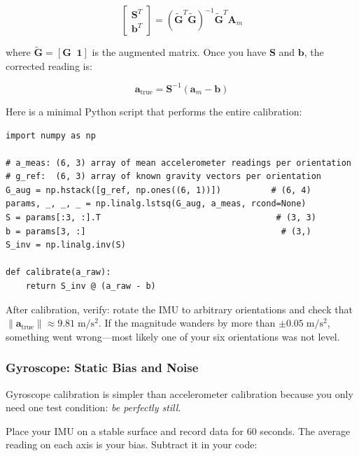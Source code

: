 \begin{equation}
\begin{bmatrix} \mathbf{S}^T \\ \mathbf{b}^T \end{bmatrix}
= \left( \tilde{\mathbf{G}}^T \tilde{\mathbf{G}} \right)^{-1} \tilde{\mathbf{G}}^T \mathbf{A}_m
\end{equation}

where $\tilde{\mathbf{G}} = [\mathbf{G} \;\; \mathbf{1}]$ is the augmented matrix. Once you have $\mathbf{S}$ and $\mathbf{b}$, the corrected reading is:

\begin{equation}
\mathbf{a}_{\text{true}} = \mathbf{S}^{-1} (\mathbf{a}_m - \mathbf{b})
\end{equation}

Here is a minimal Python script that performs the entire calibration:

\begin{verbatim}
import numpy as np

# a_meas: (6, 3) array of mean accelerometer readings per orientation
# g_ref:  (6, 3) array of known gravity vectors per orientation
G_aug = np.hstack([g_ref, np.ones((6, 1))])          # (6, 4)
params, _, _, _ = np.linalg.lstsq(G_aug, a_meas, rcond=None)
S = params[:3, :].T                                   # (3, 3)
b = params[3, :]                                       # (3,)
S_inv = np.linalg.inv(S)

def calibrate(a_raw):
    return S_inv @ (a_raw - b)
\end{verbatim}

After calibration, verify: rotate the IMU to arbitrary orientations and check that $\|\mathbf{a}_{\text{true}}\| \approx 9.81\;\mathrm{m/s^2}$. If the magnitude wanders by more than $\pm 0.05\;\mathrm{m/s^2}$, something went wrong---most likely one of your six orientations was not level.

\subsubsection{Gyroscope: Static Bias and Noise}

Gyroscope calibration is simpler than accelerometer calibration because you only need one test condition: \textit{be perfectly still}.

Place your IMU on a stable surface and record data for 60 seconds. The average reading on each axis is your bias. Subtract it in your code:

